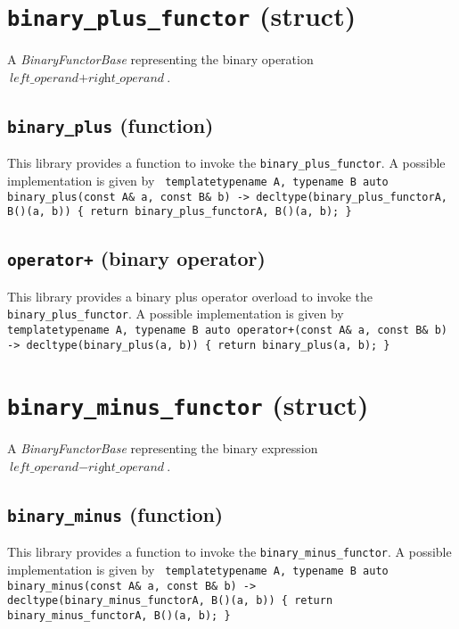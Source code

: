 \documentclass[oneside]{book}
\begin{document}


\section{\texttt{binary\_plus\_functor} (struct)}
A \textit{BinaryFunctorBase} representing the binary operation $\textit{left\_operand} + \textit{right\_operand}$.\newline

\subsection{\texttt{binary\_plus} (function)}
This library provides a function to invoke the \texttt{binary\_plus\_functor}.
A possible implementation is given by\newline
\texttt{
template\textlangle typename A, typename B\textrangle\newline
auto binary\_plus(const A\& a, const B\& b) -> decltype(binary\_plus\_functor\textlangle A, B\textrangle()(a, b))\newline
\{ return binary\_plus\_functor\textlangle A, B\textrangle()(a, b); \}
}

\subsection{\texttt{operator+} (binary operator)}
This library provides a binary plus operator overload to invoke the \texttt{binary\_plus\_functor}.
A possible implementation is given by\newline
\texttt{
template\textlangle typename A, typename B\textrangle\newline
auto operator+(const A\& a, const B\& b) -> decltype(binary\_plus(a, b))\newline
\{ return binary\_plus(a, b); \}
}

\section{\texttt{binary\_minus\_functor} (struct)}
A \textit{BinaryFunctorBase} representing the binary expression $\textit{left\_operand} - \textit{right\_operand}$.\newline

\subsection{\texttt{binary\_minus} (function)}
This library provides a function to invoke the \texttt{binary\_minus\_functor}.
A possible implementation is given by\newline
\texttt{
template\textlangle typename A, typename B\textrangle\newline
auto binary\_minus(const A\& a, const B\& b) -> decltype(binary\_minus\_functor\textlangle A, B\textrangle()(a, b))\newline
\{ return binary\_minus\_functor\textlangle A, B\textrangle()(a, b); \}
}
\end{document}
